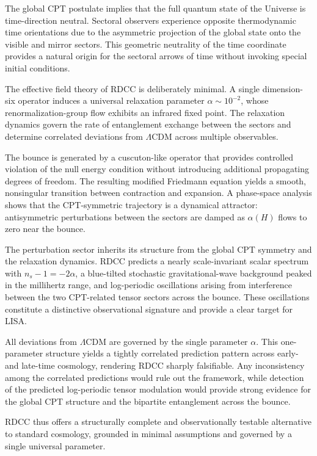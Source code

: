 \documentclass[11pt,a4paper]{article}
\begin{document}
The global CPT postulate implies that the full quantum state of the Universe is
time-direction neutral. Sectoral observers experience opposite thermodynamic
time orientations due to the asymmetric projection of the global state onto the
visible and mirror sectors. This geometric neutrality of the time coordinate
provides a natural origin for the sectoral arrows of time without invoking
special initial conditions.

The effective field theory of RDCC is deliberately minimal. A single
dimension-six operator induces a universal relaxation parameter
$\alpha \sim 10^{-2}$, whose renormalization-group flow exhibits an infrared
fixed point. The relaxation dynamics govern the rate of entanglement exchange
between the sectors and determine correlated deviations from $\Lambda$CDM across
multiple observables.

The bounce is generated by a cuscuton-like operator that provides controlled
violation of the null energy condition without introducing additional
propagating degrees of freedom. The resulting modified Friedmann equation yields
a smooth, nonsingular transition between contraction and expansion. A phase-space
analysis shows that the CPT-symmetric trajectory is a dynamical attractor:
antisymmetric perturbations between the sectors are damped as $\alpha(H)$ flows
to zero near the bounce.

The perturbation sector inherits its structure from the global CPT symmetry and
the relaxation dynamics. RDCC predicts a nearly scale-invariant scalar spectrum
with $n_{s} - 1 = -2\alpha$, a blue-tilted stochastic gravitational-wave
background peaked in the millihertz range, and log-periodic oscillations arising
from interference between the two CPT-related tensor sectors across the bounce.
These oscillations constitute a distinctive observational signature and provide a
clear target for LISA.

All deviations from $\Lambda$CDM are governed by the single parameter $\alpha$.
This one-parameter structure yields a tightly correlated prediction pattern
across early- and late-time cosmology, rendering RDCC sharply falsifiable. Any
inconsistency among the correlated predictions would rule out the framework,
while detection of the predicted log-periodic tensor modulation would provide
strong evidence for the global CPT structure and the bipartite entanglement
across the bounce.

RDCC thus offers a structurally complete and observationally testable
alternative to standard cosmology, grounded in minimal assumptions and governed
by a single universal parameter.
\end{document}
